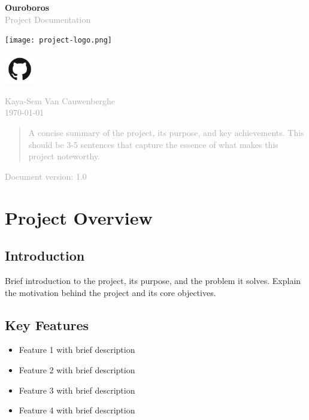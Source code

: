 \documentclass[10pt,a4paper]{article}
\newcommand{\projecttitle}[1]{
    \begin{center}
        {\Huge\bfseries\color{primary} #1}\\
        \vspace{0.5cm}
        \textcolor{darkgray}{\large Project Documentation}
    \end{center}
}
\begin{document}
\begin{titlepage}
	\centering
	\vspace*{2cm}

	\projecttitle{Ouroboros}

	\vspace{1cm}

	\texttt{[image: project-logo.png]} %

	\vspace{1cm}
	\begin{center}
		\href{https://github.com/Kaya-Sem/ouroboros}{\includegraphics[width=0.1\textwidth]{images/github-mark.png}}
	\end{center}

	\vspace{1cm}

	\textcolor{darkgray}{\large Kaya-Sem Van Cauwenberghe}\\
	\textcolor{darkgray}{\today}

	\vfill

	\begin{abstract}
		\noindent
		\textcolor{darkgray}{A concise summary of the project, its purpose, and key achievements. This should be 3-5 sentences that capture the essence of what makes this project noteworthy.}
	\end{abstract}

	\vspace{1cm}

	\small
	\textcolor{darkgray}{Document version: 1.0}
\end{titlepage}

\tableofcontents
\newpage

\section{Project Overview}
\subsection{Introduction}
Brief introduction to the project, its purpose, and the problem it solves. Explain the motivation behind the project and its core objectives.

\subsection{Key Features}
\begin{itemize}
	\item Feature 1 with brief description
	\item Feature 2 with brief description
	\item Feature 3 with brief description
	\item Feature 4 with brief description
\end{itemize}
\end{document}
